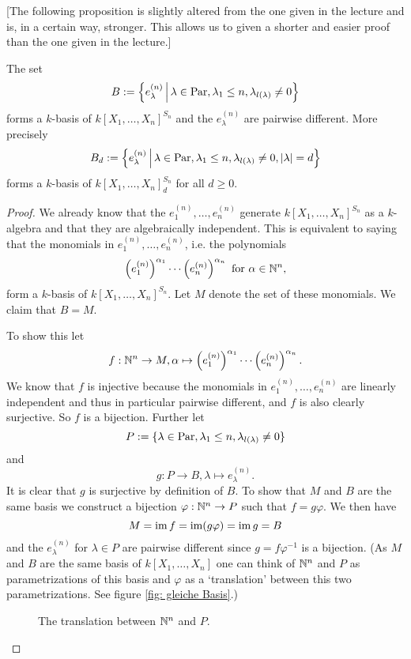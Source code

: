 [The following proposition is slightly altered from the one given in the lecture and is, in a certain way, stronger. This allows us to given a shorter and easier proof than the one given in the lecture.]
\begin{prop}
 The set
 \[
  B := \left\{ e^{(n)}_\lambda \,\middle|\, \lambda \in \operatorname{Par}, \lambda_1 \leq n, \lambda_{l(\lambda)} \neq 0 \right\}
 \]
 forms a $k$-basis of $k[X_1, \ldots, X_n]^{S_n}$ and the $e^{(n)}_\lambda$ are pairwise different. More precisely
 \[
  B_d := \left\{ e^{(n)}_\lambda \,\middle|\, \lambda \in \operatorname{Par}, \lambda_1 \leq n, \lambda_{l(\lambda)} \neq 0, |\lambda| = d \right\}
 \]
 forms a $k$-basis of $k[X_1, \ldots, X_n]^{S_n}_d$ for all $d \geq 0$.
\end{prop}
\begin{proof}[Proof]
 We already know that the $e^{(n)}_1, \ldots, e^{(n)}_n$ generate $k[X_1, \ldots, X_n]^{S_n}$ as a $k$-algebra and that they are algebraically independent. This is equivalent to saying that the monomials in $e^{(n)}_1, \ldots, e^{(n)}_n$, i.e. the polynomials
 \[
  \left(e^{(n)}_1\right)^{\alpha_1} \cdots \left(e^{(n)}_n\right)^{\alpha_n} \text{ for } \alpha \in \mathbb{N}^n,
 \]
 form a $k$-basis of $k[X_1, \ldots, X_n]^{S_n}$. Let $M$ denote the set of these monomials. We claim that $B = M$.

 To show this let
 \[
  f : \mathbb{N}^n \to M,
  \alpha \mapsto \left( e^{(n)}_1 \right)^{\alpha_1} \cdots \left( e^{(n)}_n \right)^{\alpha_n}.
 \]
 We know that $f$ is injective because the monomials in $e^{(n)}_1, \ldots, e^{(n)}_n$ are linearly independent and thus in particular pairwise different, and $f$ is also clearly surjective. So $f$ is a bijection. Further let
 \[
  P := \{\lambda \in \operatorname{Par}, \lambda_1 \leq n, \lambda_{l(\lambda)} \neq 0\}
 \]
 and
 \[
  g : P \to B, \lambda \mapsto e^{(n)}_\lambda.
 \]
 It is clear that $g$ is surjective by definition of $B$. To show that $M$ and $B$ are the same basis we construct a bijection $\varphi : \mathbb{N}^n \to P$ such that $f = g \varphi$. We then have
 \[
  M = \operatorname{im} f = \operatorname{im} (g \varphi) = \operatorname{im} g = B
 \]
 and the $e^{(n)}_\lambda$ for $\lambda \in P$ are pairwise different since $g = f \varphi^{-1}$ is a bijection. (As $M$ and $B$ are the same basis of $k[X_1, \ldots, X_n]$ one can think of $\mathbb{N}^n$ and $P$ as parametrizations of this basis and $\varphi$ as a `translation' between this two parametrizations. See figure \ref{fig:  gleiche Basis}.)
 
 \begin{figure}\centering
  \caption{The translation between $\mathbb{N}^n$ and $P$.}
  \label{fig: gleiche Basis}
 \end{figure}
 

\end{proof}
